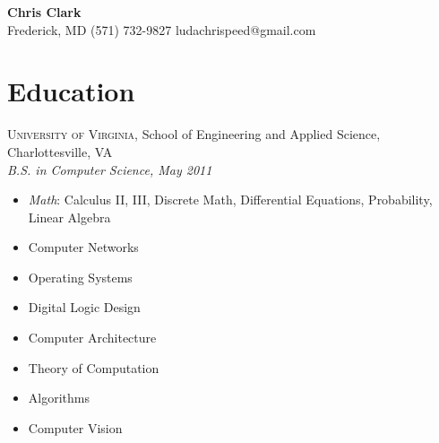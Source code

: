 \documentclass[a4paper,11pt]{article}
\begin{document}
\begin{center}
  {\sffamily \huge \textbf{Chris Clark}} \\ 
  Frederick, MD \enspace\textopenbullet\enspace
  (571) 732-9827 \enspace\textopenbullet\enspace
  ludachrispeed@gmail.com
\end{center}


\vspace{-9pt}
\section*{Education}

  \textsc{University of Virginia}, School of Engineering and Applied Science,
  Charlottesville, VA \\
  \textit{B.S. in Computer Science, May 2011}

%

  \begin{multicols}{3} 
    \raggedright

    \begin{itemize}
    \item \textit{Math}: Calculus II, III, Discrete Math, Differential Equations, Probability,
      Linear Algebra
    \item Computer Networks
    \item Operating Systems
    \item Digital Logic Design
    \item Computer Architecture
    \item Theory of Computation
    \item Algorithms
    \item Computer Vision
    \end{itemize}
  \end{multicols}
\end{document}
